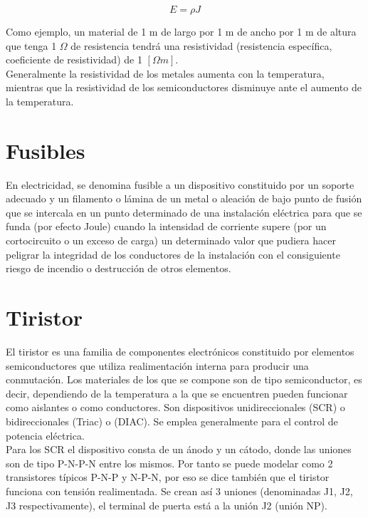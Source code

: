 \documentclass{article}
\begin{document}
\begin{equation}
    E=\rho J
\end{equation}


Como ejemplo, un material de 1 m de largo por 1 m de ancho por 1 m de altura que tenga 1 $\Omega$ de resistencia tendrá una resistividad (resistencia específica, coeficiente de resistividad) de 1 $[\Omega m]$.\citep{Res}\\

Generalmente la resistividad de los metales aumenta con la temperatura, mientras que la resistividad de los semiconductores disminuye ante el aumento de la temperatura.\citep{Res}\\

\section{Fusibles}

En electricidad, se denomina fusible a un dispositivo constituido por un soporte adecuado y un filamento o lámina de un metal o aleación de bajo punto de fusión que se intercala en un punto determinado de una instalación eléctrica para que se funda (por efecto Joule) cuando la intensidad de corriente supere (por un cortocircuito o un exceso de carga) un determinado valor que pudiera hacer peligrar la integridad de los conductores de la instalación con el consiguiente riesgo de incendio o destrucción de otros elementos.\citep{Fus}

\section{Tiristor}

El tiristor es una familia de componentes electrónicos constituido por elementos semiconductores que utiliza realimentación interna para producir una conmutación. Los materiales de los que se compone son de tipo semiconductor, es decir, dependiendo de la temperatura a la que se encuentren pueden funcionar como aislantes o como conductores. Son dispositivos unidireccionales (SCR) o bidireccionales (Triac) o (DIAC). Se emplea generalmente para el control de potencia eléctrica.\citep{Tirs}\\

Para los SCR el dispositivo consta de un ánodo y un cátodo, donde las uniones son de tipo P-N-P-N entre los mismos. Por tanto se puede modelar como 2 transistores típicos P-N-P y N-P-N, por eso se dice también que el tiristor funciona con tensión realimentada. Se crean así 3 uniones (denominadas J1, J2, J3 respectivamente), el terminal de puerta está a la unión J2 (unión NP).\citep{Tirs}\\
\end{document}
